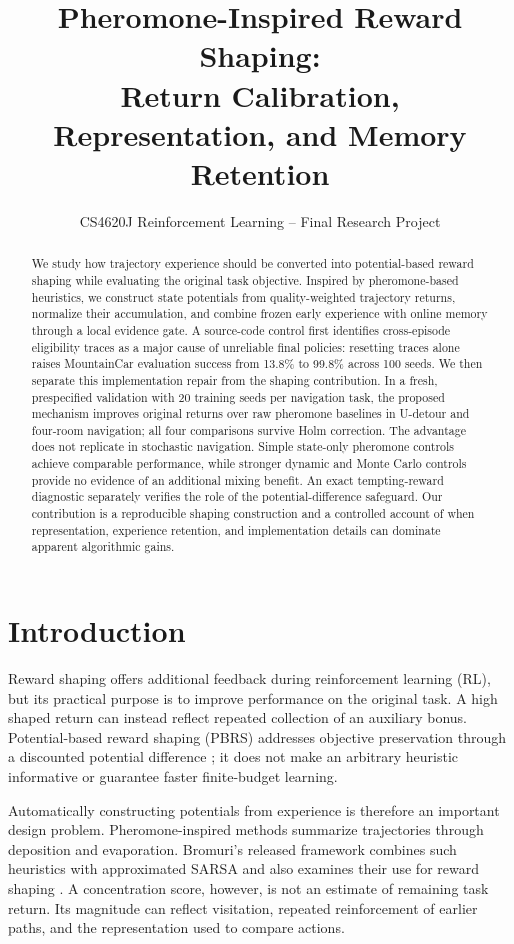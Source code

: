 \documentclass[10pt,twocolumn,letterpaper]{article}
\title{\vspace{-1.0em}\Large\bfseries Pheromone-Inspired Reward Shaping:\\Return Calibration, Representation, and Memory Retention\vspace{-0.3em}}
\author{}
\date{\small CS4620J Reinforcement Learning -- Final Research Project\vspace{-1.0em}}
\begin{document}
\raggedbottom
\maketitle
\begin{abstract}
We study how trajectory experience should be converted into potential-based reward shaping while evaluating the original task objective. Inspired by pheromone-based heuristics, we construct state potentials from quality-weighted trajectory returns, normalize their accumulation, and combine frozen early experience with online memory through a local evidence gate. A source-code control first identifies cross-episode eligibility traces as a major cause of unreliable final policies: resetting traces alone raises MountainCar evaluation success from 13.8\% to 99.8\% across 100 seeds. We then separate this implementation repair from the shaping contribution. In a fresh, prespecified validation with 20 training seeds per navigation task, the proposed mechanism improves original returns over raw pheromone baselines in U-detour and four-room navigation; all four comparisons survive Holm correction. The advantage does not replicate in stochastic navigation. Simple state-only pheromone controls achieve comparable performance, while stronger dynamic and Monte Carlo controls provide no evidence of an additional mixing benefit. An exact tempting-reward diagnostic separately verifies the role of the potential-difference safeguard. Our contribution is a reproducible shaping construction and a controlled account of when representation, experience retention, and implementation details can dominate apparent algorithmic gains.
\end{abstract}

\section{Introduction}
Reward shaping offers additional feedback during reinforcement learning (RL), but its practical purpose is to improve performance on the original task. A high shaped return can instead reflect repeated collection of an auxiliary bonus. Potential-based reward shaping (PBRS) addresses objective preservation through a discounted potential difference \citep{ng1999}; it does not make an arbitrary heuristic informative or guarantee faster finite-budget learning.

Automatically constructing potentials from experience is therefore an important design problem. Pheromone-inspired methods summarize trajectories through deposition and evaporation. Bromuri's released framework combines such heuristics with approximated SARSA and also examines their use for reward shaping \citep{bromuri2019,authorcode}. A concentration score, however, is not an estimate of remaining task return. Its magnitude can reflect visitation, repeated reinforcement of earlier paths, and the representation used to compare actions.
\end{document}
